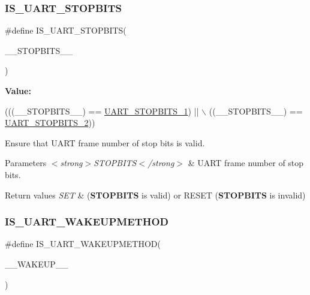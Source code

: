 \subsubsection{\texorpdfstring{I\+S\+\_\+\+U\+A\+R\+T\+\_\+\+S\+T\+O\+P\+B\+I\+TS}{IS\_UART\_STOPBITS}}
{\footnotesize\ttfamily \#define I\+S\+\_\+\+U\+A\+R\+T\+\_\+\+S\+T\+O\+P\+B\+I\+TS(\begin{DoxyParamCaption}\item[{}]{\+\_\+\+\_\+\+S\+T\+O\+P\+B\+I\+T\+S\+\_\+\+\_\+ }\end{DoxyParamCaption})}

{\bfseries Value\+:}
\begin{DoxyCode}
(((\_\_STOPBITS\_\_) == \hyperlink{group___u_a_r_t___stop___bits_ga7cf97e555292d574de8abc596ba0e2ce}{UART\_STOPBITS\_1})   || \(\backslash\)
                                        ((\_\_STOPBITS\_\_) == \hyperlink{group___u_a_r_t___stop___bits_ga91616523380f7450aac6cb7e17f0c0f2}{UART\_STOPBITS\_2}))
\end{DoxyCode}


Ensure that U\+A\+RT frame number of stop bits is valid. 


\begin{DoxyParams}{Parameters}
{\em $<$strong$>$\+S\+T\+O\+P\+B\+I\+T\+S$<$/strong$>$} & U\+A\+RT frame number of stop bits. \\
\hline
\end{DoxyParams}

\begin{DoxyRetVals}{Return values}
{\em S\+ET} & ({\bfseries S\+T\+O\+P\+B\+I\+TS} is valid) or R\+E\+S\+ET ({\bfseries S\+T\+O\+P\+B\+I\+TS} is invalid) \\
\hline
\end{DoxyRetVals}
\mbox{\label{group___u_a_r_t___private___macros_ga144aecf3ad6ca3ce6653ae113c9a6141}} 
\subsubsection{\texorpdfstring{I\+S\+\_\+\+U\+A\+R\+T\+\_\+\+W\+A\+K\+E\+U\+P\+M\+E\+T\+H\+OD}{IS\_UART\_WAKEUPMETHOD}}
{\footnotesize\ttfamily \#define I\+S\+\_\+\+U\+A\+R\+T\+\_\+\+W\+A\+K\+E\+U\+P\+M\+E\+T\+H\+OD(\begin{DoxyParamCaption}\item[{}]{\+\_\+\+\_\+\+W\+A\+K\+E\+U\+P\+\_\+\+\_\+ }\end{DoxyParamCaption})}

